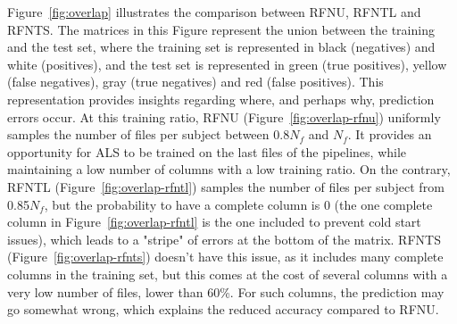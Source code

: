 \documentclass[10pt, conference, compsocconf]{IEEEtran}
\begin{document}
Figure~\ref{fig:overlap} illustrates the comparison between RFNU, RFNTL 
and RFNTS. The matrices in this Figure represent the union between the 
training and the test set, where the training set is represented in 
black (negatives) and white (positives), and the test set is 
represented in green (true positives), yellow (false negatives), gray 
(true negatives) and red (false positives). This representation 
provides insights regarding where, and perhaps why, prediction errors 
occur. At this training ratio, RFNU (Figure~\ref{fig:overlap-rfnu}) 
uniformly samples the number of files per subject between 0.8$N_f$ and 
$N_f$. It provides an opportunity for ALS to be trained on the last 
files of the pipelines, while maintaining a low number of columns with 
a low training ratio. On the contrary, RFNTL 
(Figure~\ref{fig:overlap-rfntl}) samples the number of files per 
subject from 0.85$N_f$, but the probability to have a complete column 
is 0 (the one complete column in Figure~\ref{fig:overlap-rfntl} is the 
one included to prevent cold start issues), which leads to a "stripe" 
of errors at the bottom of the matrix. RFNTS 
(Figure~\ref{fig:overlap-rfnts}) doesn't have this issue, as it 
includes many complete columns in the training set, but this comes at 
the cost of several columns with a very low number of files, lower than 
60\%. For such columns, the prediction may go somewhat wrong, which explains
the reduced accuracy compared to RFNU.
\end{document}
